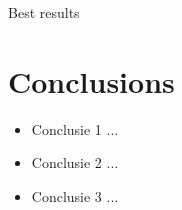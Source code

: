 \documentclass{beamer}
\begin{document}
\begin{frame}{Best results}

\begin{table}
\begin{center}

\end{center}
\end{table}

\end{frame}

\section{Conclusions}

\begin{frame}
\begin{itemize}
\item Conclusie 1 ...
\item Conclusie 2 ...
\item Conclusie 3 ...
\end{itemize}
\end{frame}
\end{document}
